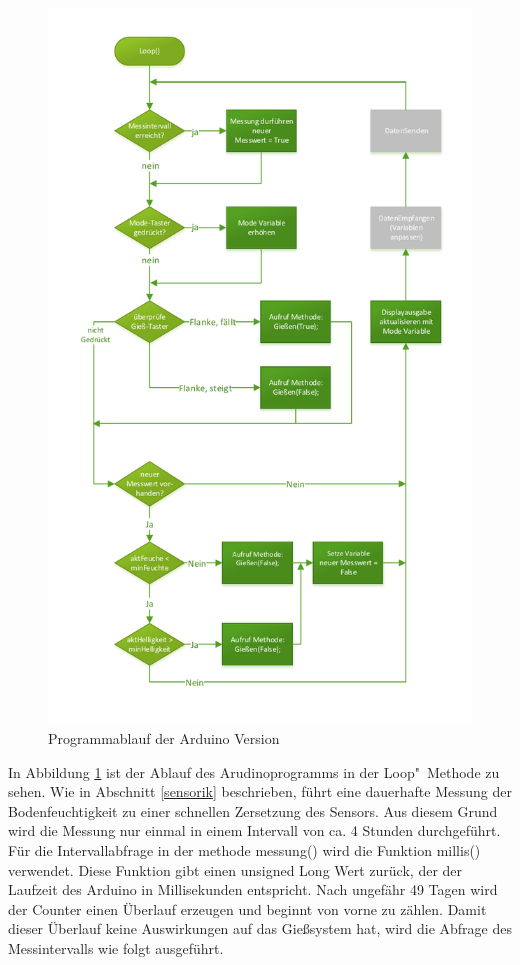 	
\begin{figure}[h]
	\centering
	\includegraphics[width=\linewidth]{diagramme/AV_Ablaufdiagramm.pdf}
	\caption{Programmablauf der Arduino Version}
	\label{fig-AV_Ablaufplan}
\end{figure}
	
In Abbildung \ref{fig-AV_Ablaufplan} ist der Ablauf des Arudinoprogramms in der Loop"~Methode zu sehen.
Wie in Abschnitt \ref{sensorik} beschrieben, führt eine dauerhafte Messung der Bodenfeuchtigkeit zu einer schnellen Zersetzung des Sensors.
Aus diesem Grund wird die Messung nur einmal in einem Intervall von ca. 4 Stunden durchgeführt. Für die Intervallabfrage in der methode messung() wird die Funktion millis() verwendet. Diese Funktion gibt einen unsigned Long Wert zurück, der der Laufzeit des Arduino in Millisekunden entspricht. Nach ungefähr 49 Tagen wird der Counter einen Überlauf erzeugen und beginnt von vorne zu zählen. Damit dieser Überlauf keine Auswirkungen auf das Gießsystem hat, wird die Abfrage des Messintervalls wie folgt  ausgeführt.

